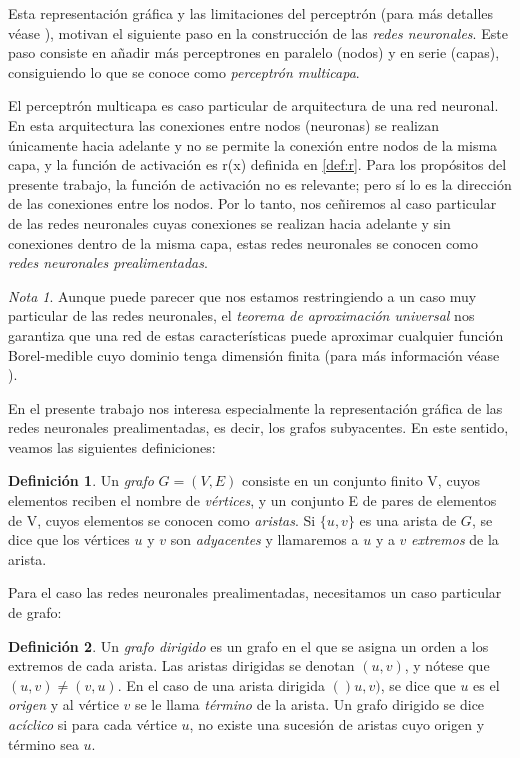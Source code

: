 \documentclass[12pt, a4paper, twoside]{book}
\numberwithin{equation}{section}
\theoremstyle{definition}
\newtheorem{defi}{Definición}
\theoremstyle{remark}
\newtheorem*{remark}{Nota}
\theoremstyle{plain}
\begin{document}
	Esta representación gráfica y las limitaciones del perceptrón (para 
	más detalles véase \cite{}), motivan el siguiente paso en la 
	construcción de las \emph{redes neuronales}. Este paso consiste en 
	añadir más perceptrones en paralelo (nodos) y en serie (capas), 
	consiguiendo lo que se conoce como \emph{perceptrón multicapa}.

	El perceptrón multicapa es caso particular de arquitectura de una red 
	neuronal. En esta arquitectura las conexiones entre nodos (neuronas) 
	se realizan únicamente hacia adelante y no se permite la conexión 
	entre nodos de la misma capa, y la función de activación es 
	r(x) definida en \ref{def:r}. Para los propósitos del presente 
	trabajo, la función de activación no es relevante; pero sí lo es la 
	dirección de las conexiones entre los nodos. Por lo tanto, nos 
	ceñiremos al caso particular de las redes neuronales cuyas conexiones
	se realizan hacia adelante y sin conexiones dentro de la misma capa, 
	estas redes neuronales se conocen como \emph{redes neuronales 
	prealimentadas}. 
	
	\begin{remark}
	Aunque puede parecer que nos 
	estamos restringiendo a un caso muy particular de las redes 
	neuronales, el \emph{teorema de aproximación universal} nos garantiza
	que una red de estas características puede aproximar cualquier función
	Borel-medible cuyo dominio tenga dimensión finita (para más 
	información véase \cite{TeoremaAproxUn-Kurt}).
	\end{remark}

	En el presente trabajo nos interesa especialmente la representación 
	gráfica de las redes neuronales prealimentadas, es decir, los grafos 
	subyacentes. En este sentido, veamos las siguientes definiciones:

	\begin{defi}
		Un \textit{grafo} $G=(V,E)$ consiste en un conjunto finito V, 
		cuyos 
		elementos reciben el nombre de \textit{vértices}, y un 
		conjunto 
		E de pares de elementos de V, cuyos elementos se conocen como 
		\textit{aristas}. Si $\{u,v\}$ es una arista de $G$, se dice 
		que los vértices $u$ y $v$ son \textit{adyacentes} y 
		llamaremos a $u$ y a $v$ \textit{extremos} de la arista.
	\end{defi}

	Para el caso las redes neuronales prealimentadas, necesitamos un caso 
	particular de grafo:
	\begin{defi}
		Un \textit{grafo dirigido} es un grafo en el que se asigna un 
		orden a los extremos de cada arista. Las aristas dirigidas se
		denotan $(u,v)$, y nótese que $(u,v)\neq(v,u)$. En el 
		caso de una arista dirigida $()u,v)$, se dice que $u$ es el 
		\textit{origen} y al vértice $v$ se le llama \textit{término} 
		de la arista. Un grafo dirigido se dice \textit{acíclico} si 
		para cada vértice $u$, no existe una sucesión de aristas cuyo
		origen y término sea $u$.
	\end{defi}
\end{document}
